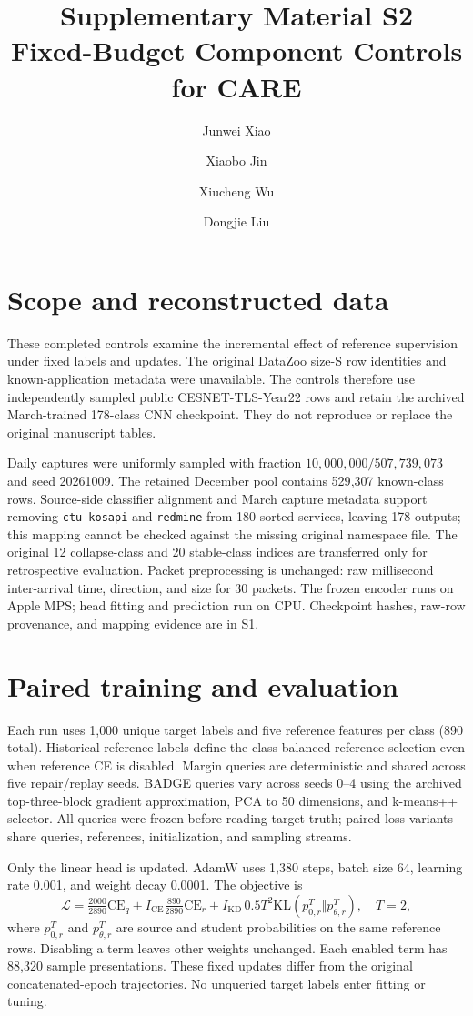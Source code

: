 \documentclass[11pt]{article}
\title{Supplementary Material S2\\Fixed-Budget Component Controls for CARE}
\author{Junwei Xiao \and Xiaobo Jin \and Xiucheng Wu \and Dongjie Liu}
\date{}
\begin{document}
\maketitle
\section{Scope and reconstructed data}
These completed controls examine the incremental effect of reference supervision under fixed labels and updates. The original DataZoo size-S row identities and known-application metadata were unavailable. The controls therefore use independently sampled public CESNET-TLS-Year22 rows and retain the archived March-trained 178-class CNN checkpoint. They do not reproduce or replace the original manuscript tables.

Daily captures were uniformly sampled with fraction $10{,}000{,}000/507{,}739{,}073$ and seed 20261009. The retained December pool contains 529{,}307 known-class rows. Source-side classifier alignment and March capture metadata support removing \texttt{ctu-kosapi} and \texttt{redmine} from 180 sorted services, leaving 178 outputs; this mapping cannot be checked against the missing original namespace file. The original 12 collapse-class and 20 stable-class indices are transferred only for retrospective evaluation. Packet preprocessing is unchanged: raw millisecond inter-arrival time, direction, and size for 30 packets. The frozen encoder runs on Apple MPS; head fitting and prediction run on CPU. Checkpoint hashes, raw-row provenance, and mapping evidence are in S1.

\section{Paired training and evaluation}
Each run uses 1{,}000 unique target labels and five reference features per class (890 total). Historical reference labels define the class-balanced reference selection even when reference CE is disabled. Margin queries are deterministic and shared across five repair/replay seeds. BADGE queries vary across seeds 0--4 using the archived top-three-block gradient approximation, PCA to 50 dimensions, and k-means++ selector. All queries were frozen before reading target truth; paired loss variants share queries, references, initialization, and sampling streams.

Only the linear head is updated. AdamW uses 1{,}380 steps, batch size 64, learning rate 0.001, and weight decay 0.0001. The objective is
\[
\mathcal L=\tfrac{2000}{2890}\mathrm{CE}_{q}
 +I_{\mathrm{CE}}\tfrac{890}{2890}\mathrm{CE}_{r}
 +I_{\mathrm{KD}}\,0.5T^2\mathrm{KL}(p_{0,r}^{T}\Vert p_{\theta,r}^{T}),\quad T=2,
\]
where $p_{0,r}^{T}$ and $p_{\theta,r}^{T}$ are source and student probabilities on the same reference rows. Disabling a term leaves other weights unchanged. Each enabled term has 88{,}320 sample presentations. These fixed updates differ from the original concatenated-epoch trajectories. No unqueried target labels enter fitting or tuning.
\end{document}
